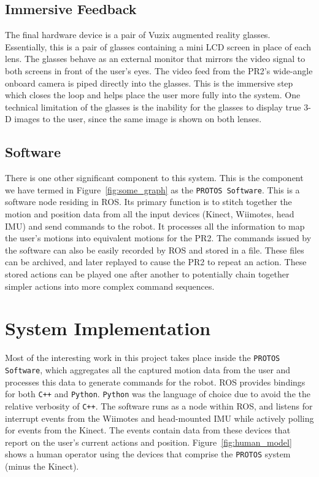 \documentclass{sig-alternate}
\begin{document}
\subsection{Immersive Feedback}
\label{sec:model_feedback}
The final hardware device is a pair of Vuzix augmented reality glasses.
Essentially, this is a pair of glasses containing a mini LCD screen in place of
each lens. The glasses behave as
an external monitor that mirrors the video signal to both screens in front
of the user's eyes. 
The video feed from the PR2's wide-angle onboard camera is piped
directly into the glasses. This is the immersive step which closes the loop and
helps place the user more fully into the system. One technical limitation of the glasses is
the inability for the glasses to display true 3-D images to the user, since the same image is
shown on both lenses.

\subsection{Software}
\label{sec:model_software}
There is one other significant component to this system. This is the
component we have
termed in Figure~\ref{fig:some_graph} as the {\tt PROTOS Software}. This is a 
software node residing in ROS. Its primary function is to stitch together the
motion and position data from all the input devices (Kinect, Wiimotes, head 
IMU) and send commands to the robot. It processes all the information to map the user's motions
into equivalent motions for the PR2. The commands issued by the software can also be easily recorded by 
ROS and stored in a file. These files can be archived, and later replayed to cause the PR2 to repeat an action.
These stored actions can be played one after another to potentially chain together simpler actions into
more complex command sequences.

\section{System Implementation}
\label{sec:system_implementation}
Most of the interesting work in this project takes place inside the
{\tt PROTOS Software}, which aggregates all the captured motion data from the
user and processes this data to generate commands for the robot. ROS provides
bindings for both {\tt C++} and {\tt Python}. {\tt Python} was the language of choice due to avoid
the the relative verbosity of {\tt C++}.
The software runs as a node within ROS, and listens for interrupt events from the Wiimotes and head-mounted
IMU while actively polling for events from the Kinect. The events contain data
from these devices that report on the user's current actions and position. Figure~\ref{fig:human_model} shows
a human operator using the devices that comprise the {\tt PROTOS} system (minus the Kinect).
\end{document}
